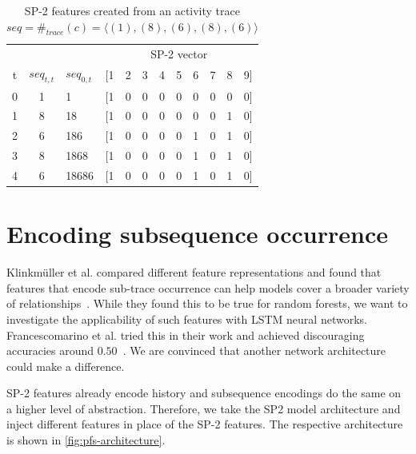 \begin{table}[!htb]
    \centering
    \begin{adjustbox}{center}
    \begin{tabular}{cclccccccccc}
          &      &              & \multicolumn{9}{c}{SP-2 vector}\\
 t & $seq_{t, t}$ & $seq_{0,t}$ & [1 & 2 & 3 & 4 & 5 & 6 & 7 & 8 & 9]\\
        \midrule
        0 & 1    & 1            & [1 & 0 & 0 & 0 & 0 & 0 & 0 & 0 & 0]\\
        1 & 8    & 18           & [1 & 0 & 0 & 0 & 0 & 0 & 0 & 1 & 0]\\
        2 & 6    & 186          & [1 & 0 & 0 & 0 & 0 & 1 & 0 & 1 & 0]\\
        3 & 8    & 1868         & [1 & 0 & 0 & 0 & 0 & 1 & 0 & 1 & 0]\\
        4 & 6    & 18686        & [1 & 0 & 0 & 0 & 0 & 1 & 0 & 1 & 0]\\
    \end{tabular}
    \end{adjustbox}
    \caption[SP-2 features created from an activity trace]{SP-2 features created from an activity trace $seq=\#_{trace}(c)=\langle (1), (8), (6), (8), (6)\rangle$}
    \label{tab:sp2-activity-trace}
\end{table}


\section{Encoding subsequence occurrence}\label{sec:contrib:pfs-inspiration}
Klinkmüller et al. compared different feature representations and found that features that encode sub-trace occurrence can help models cover a broader variety of relationships~\cite{klinkmuller2018reliablemonitoring}.
While they found this to be true for random forests, we want to investigate the applicability of such features with LSTM neural networks.
Francescomarino et al. tried this in their work and achieved discouraging accuracies around $0.50$~\cite{francescomarino2017}.
We are convinced that another network architecture could make a difference.

SP-2 features already encode history and subsequence encodings do the same on a higher level of abstraction.
Therefore, we take the SP2 model architecture and inject different features in place of the SP-2 features.
The respective architecture is shown in \autoref{fig:pfs-architecture}.

